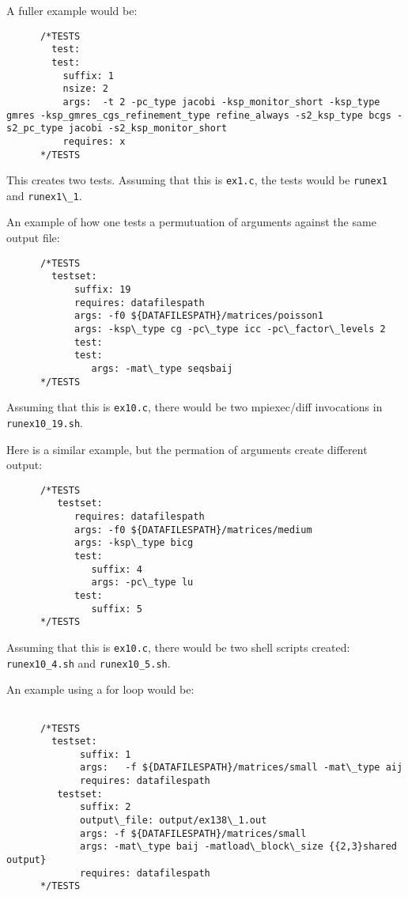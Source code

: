 A fuller example would be:
%
\begin{lstlisting}
      /*TESTS
        test: 
        test:
          suffix: 1
          nsize: 2
          args:  -t 2 -pc_type jacobi -ksp_monitor_short -ksp_type gmres -ksp_gmres_cgs_refinement_type refine_always -s2_ksp_type bcgs -s2_pc_type jacobi -s2_ksp_monitor_short
          requires: x
      */TESTS
\end{lstlisting}

This creates two tests.  Assuming that this is \lstinline{ex1.c}, the tests would
be \lstinline{runex1} and \lstinline{runex1\_1}.


An example of how one tests a permutuation of arguments against the same
output file:
%
\begin{lstlisting}
      /*TESTS
        testset:
            suffix: 19
            requires: datafilespath
            args: -f0 ${DATAFILESPATH}/matrices/poisson1
            args: -ksp\_type cg -pc\_type icc -pc\_factor\_levels 2
            test:
            test:
               args: -mat\_type seqsbaij 
      */TESTS
\end{lstlisting}

Assuming that this is \lstinline{ex10.c}, there would be two
mpiexec/diff invocations in \lstinline{runex10_19.sh}.

Here is a similar example, but the permation of arguments create
different output:

\begin{lstlisting}
      /*TESTS
         testset:
            requires: datafilespath
            args: -f0 ${DATAFILESPATH}/matrices/medium
            args: -ksp\_type bicg
            test:
               suffix: 4
               args: -pc\_type lu
            test:
               suffix: 5 
      */TESTS
\end{lstlisting}
Assuming that this is \lstinline{ex10.c}, there would be two shell
scripts created: \lstinline{runex10_4.sh} and \lstinline{runex10_5.sh}.

An example using a for loop would be:
%
\begin{lstlisting}

      /*TESTS
        testset:
             suffix: 1
             args:   -f ${DATAFILESPATH}/matrices/small -mat\_type aij
             requires: datafilespath
         testset:
             suffix: 2
             output\_file: output/ex138\_1.out
             args: -f ${DATAFILESPATH}/matrices/small
             args: -mat\_type baij -matload\_block\_size {{2,3}shared output}
             requires: datafilespath
      */TESTS

\end{lstlisting}

